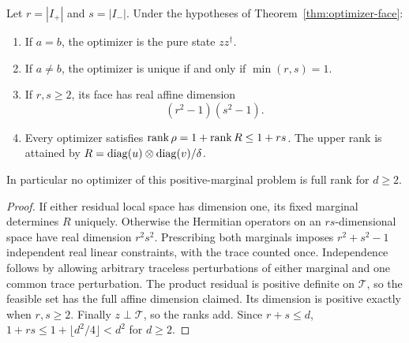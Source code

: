\begin{corollary}\label{cor:face-dimension}
Let $r=|I_+|$ and $s=|I_-|$. Under the hypotheses of Theorem~\ref{thm:optimizer-face}:
\begin{enumerate}
\item If $a=b$, the optimizer is the pure state $zz^\dagger$.
\item If $a\ne b$, the optimizer is unique if and only if $\min(r,s)=1$.
\item If $r,s\ge2$, its face has real affine dimension
\[
 (r^2-1)(s^2-1).
\]
\item Every optimizer satisfies $\operatorname{rank}\rho=1+\operatorname{rank} R\le1+rs$. The upper rank is attained by $R=\operatorname{diag}(u)\otimes\operatorname{diag}(v)/\delta$.
\end{enumerate}
In particular no optimizer of this positive-marginal problem is full rank for $d\ge2$.
\end{corollary}
\begin{proof}
If either residual local space has dimension one, its fixed marginal determines $R$ uniquely. Otherwise the Hermitian operators on an $r s$-dimensional space have real dimension $r^2s^2$. Prescribing both marginals imposes $r^2+s^2-1$ independent real linear constraints, with the trace counted once. Independence follows by allowing arbitrary traceless perturbations of either marginal and one common trace perturbation. The product residual is positive definite on $\mathcal T$, so the feasible set has the full affine dimension claimed. Its dimension is positive exactly when $r,s\ge2$. Finally $z\perp\mathcal T$, so the ranks add. Since $r+s\le d$, $1+rs\le1+\lfloor d^2/4\rfloor<d^2$ for $d\ge2$.
\end{proof}

